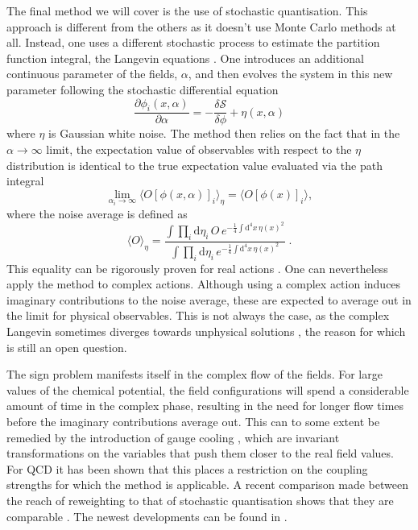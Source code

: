 The final method we will cover is the use of stochastic quantisation. This
approach is different from the others as it doesn't use Monte Carlo methods at
all. Instead, one uses a different stochastic process to estimate the partition
function integral, the Langevin equations \citep{Parisi:1980ys}. One introduces
an additional continuous parameter of the fields, $\alpha$, and then evolves the
system in this new parameter following the stochastic differential equation
%
\begin{equation}
  \frac{\partial \phi_i (x, \alpha)}{\partial \alpha} = - \frac{\delta
    \mathcal{S}}{\delta \phi} + \eta(x,\alpha)
\end{equation}
%
where $\eta$ is Gaussian white noise. The method then relies on the fact that
in the $\alpha \to \infty$ limit, the expectation value of observables with respect
to the $\eta$ distribution is identical to the true expectation value evaluated
via the path integral
%
\begin{equation}
  \lim_{\alpha_i\to\infty} \big\langle O [\phi(x,\alpha)]_i \big\rangle_{\eta}
    = \big\langle O [\phi(x)]_i \big\rangle,
\end{equation}
%
where the noise average is defined as
%
\begin{equation}
  \big\langle O \big\rangle_{\eta} =
  \frac{\int \prod_i \mathrm{d} \eta_i \,O\, e^{-\frac{1}{4}\int \mathrm{d}^4
      x\, \eta(x)^2}}{\int \prod_i \mathrm{d} \eta_i \, e^{-\frac{1}{4}\int
      \mathrm{d}^4 x\, \eta(x)^2}}\;.
\end{equation}
%
This equality can be rigorously proven for real actions
\citep{Damgaard:1987rr,Huffel:2003hf}. One can nevertheless apply the
method to complex actions. Although using a complex action induces imaginary
contributions to the noise average, these are expected to average out in the
limit for physical observables. This is not always the case, as the complex
Langevin sometimes diverges towards unphysical solutions \citep{Ambjorn:1985iw},
the reason for which is still an open question.

The sign problem manifests itself in the complex flow of the fields. For
large values of the chemical potential, the field configurations will spend a
considerable amount of time in the complex phase, resulting in the need for
longer flow times before the imaginary contributions average out. This can to
some extent be remedied by the introduction of gauge cooling
\citep{Seiler:2012wz}, which are invariant transformations on the variables that
push them closer to the real field values. For QCD it has been shown that this
places a restriction on the coupling strengths for which the method is
applicable.  A recent comparison made between the reach of reweighting to that
of stochastic quantisation shows that they are comparable \citep{Fodor:2015doa}.
The newest developments can be found in \citep{Aarts:2016qrv}.

